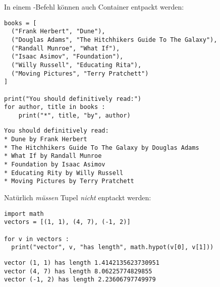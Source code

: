 In einem -Befehl können auch Container entpackt werden:
\begin{codebox}
\begin{verbatim}
books = [
  ("Frank Herbert", "Dune"), 
  ("Douglas Adams", "The Hitchhikers Guide To The Galaxy"),
  ("Randall Munroe", "What If"),
  ("Isaac Asimov", "Foundation"),
  ("Willy Russell", "Educating Rita"),
  ("Moving Pictures", "Terry Pratchett")
]

print("You should definitively read:")
for author, title in books :
    print("*", title, "by", author)
\end{verbatim}
\end{codebox}

\begin{cmdbox}
\begin{verbatim}
You should definitively read:
* Dune by Frank Herbert
* The Hitchhikers Guide To The Galaxy by Douglas Adams
* What If by Randall Munroe
* Foundation by Isaac Asimov
* Educating Rity by Willy Russell
* Moving Pictures by Terry Pratchett
\end{verbatim}
\end{cmdbox}

Natürlich \emph{müssen} Tupel \emph{nicht} enptackt werden:
\begin{codebox}
\begin{verbatim}
import math
vectors = [(1, 1), (4, 7), (-1, 2)]

for v in vectors :
  print("vector", v, "has length", math.hypot(v[0], v[1]))
\end{verbatim}
\end{codebox}

\begin{cmdbox}
\begin{verbatim}
vector (1, 1) has length 1.4142135623730951
vector (4, 7) has length 8.06225774829855
vector (-1, 2) has length 2.23606797749979
\end{verbatim}
\end{cmdbox}



